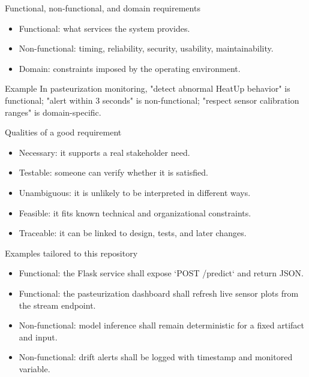 \begin{frame}{Functional, non-functional, and domain requirements}
\begin{itemize}
\item Functional: what services the system provides.
\item Non-functional: timing, reliability, security, usability, maintainability.
\item Domain: constraints imposed by the operating environment.
\end{itemize}
\begin{block}{Example}
In pasteurization monitoring, "detect abnormal HeatUp behavior" is functional; "alert within 3 seconds" is non-functional; "respect sensor calibration ranges" is domain-specific.
\end{block}
\coursefooter
\end{frame}

\begin{frame}{Qualities of a good requirement}
\begin{itemize}
\item Necessary: it supports a real stakeholder need.
\item Testable: someone can verify whether it is satisfied.
\item Unambiguous: it is unlikely to be interpreted in different ways.
\item Feasible: it fits known technical and organizational constraints.
\item Traceable: it can be linked to design, tests, and later changes.
\end{itemize}
\coursefooter
\end{frame}

\begin{frame}{Examples tailored to this repository}
\begin{itemize}
\item Functional: the Flask service shall expose `POST /predict` and return JSON.
\item Functional: the pasteurization dashboard shall refresh live sensor plots from the stream endpoint.
\item Non-functional: model inference shall remain deterministic for a fixed artifact and input.
\item Non-functional: drift alerts shall be logged with timestamp and monitored variable.
\end{itemize}
\coursefooter
\end{frame}

